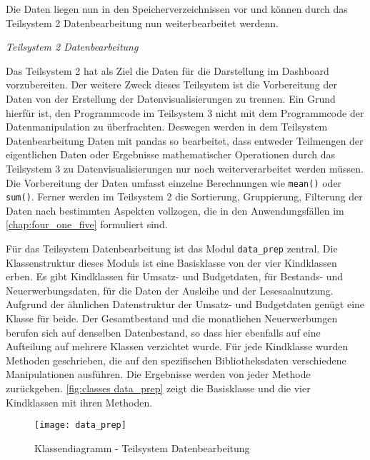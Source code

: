     Die Daten liegen nun in den Speicherverzeichnissen vor und können durch das Teilsystem 2 Datenbearbeitung 
    nun weiterbearbeitet werdenn.
    

    \noindent
    \textit{Teilsystem 2 Datenbearbeitung}

    Das Teilsystem 2 hat als Ziel die Daten für die Darstellung im Dashboard vorzubereiten. Der weitere Zweck dieses
    Teilsystem ist die Vorbereitung der Daten von der Erstellung der Datenvisualisierungen zu trennen. Ein Grund hierfür
    ist, den Programmcode im Teilsystem 3 nicht mit dem Programmcode der Datenmanipulation zu überfrachten. 
    Deswegen werden in dem Teilsystem Datenbearbeitung Daten mit pandas so bearbeitet, 
    dass entweder Teilmengen der eigentlichen Daten oder Ergebnisse mathematischer Operationen durch das Teilsystem 3 
    zu Datenvisualisierungen nur noch weiterverarbeitet werden müssen. Die Vorbereitung der Daten umfasst einzelne Berechnungen 
    wie \texttt{mean()} oder \texttt{sum()}. Ferner werden im Teilsystem 2 die Sortierung, Gruppierung, Filterung der 
    Daten nach bestimmten Aspekten vollzogen, die in den Anwendungsfällen im \autoref{chap:four_one_five} formuliert sind.
    
    Für das Teilsystem Datenbearbeitung ist das Modul \texttt{data\_prep} zentral. Die Klassenstruktur dieses Moduls ist eine 
    Basisklasse von der vier Kindklassen erben. Es gibt Kindklassen für Umsatz- und Budgetdaten, für Bestands- und Neuerwerbungsdaten, für die Daten der Ausleihe und 
    der Lesesaalnutzung. Aufgrund der ähnlichen Datenstruktur der Umsatz- und Budgetdaten genügt eine Klasse für beide.
    Der Gesamtbestand und die monatlichen Neuerwerbungen berufen sich auf denselben Datenbestand, so dass hier ebenfalls auf eine Aufteilung auf mehrere Klassen verzichtet wurde.
    Für jede Kindklasse wurden Methoden geschrieben, die auf den spezifischen Bibliotheksdaten verschiedene Manipulationen ausführen.
    Die Ergebnisse werden von jeder Methode zurückgeben. \autoref{fig:classes data_prep} zeigt die Basisklasse und die vier Kindklassen mit ihren Methoden.


    \begin{figure}[H]
        \centering
            \texttt{[image: data\_prep]}
            \caption{Klassendiagramm - Teilsystem Datenbearbeitung}
            \label{fig:classes data_prep}
    \end{figure}

